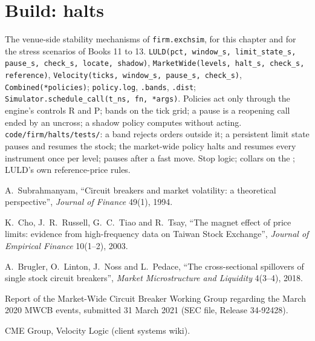 \section{Build: halts}\label{bld:mx:circuit-breakers-and-halts:halts}

\begin{build}
 The venue-side stability mechanisms of \texttt{firm.exchsim}, for this chapter and for the stress scenarios of Books 11 to 13.
 \texttt{LULD(pct, window\_s, limit\_state\_s, pause\_s, check\_s, locate, shadow)}, \texttt{MarketWide(levels, halt\_s, check\_s,
reference)}, \texttt{Velocity(ticks, window\_s, pause\_s, check\_s)}, \texttt{Combined(*policies)}; \texttt{policy.log}, \texttt{.bands},
\texttt{.dist}; \texttt{Simulator.schedule\_call(t\_ns, fn, *args)}.
 Policies act only through the engine's controls R and P; bands on the tick grid; a pause is a reopening call ended by an uncross; a
shadow policy computes without acting.
 \texttt{code/firm/halts/tests/}: a band rejects orders outside it; a persistent limit state pauses and resumes the stock; the
market-wide policy halts and resumes every instrument once per level;  pauses after a fast move.
 Stop logic; collars on the ; LULD's own reference-price rules.
\end{build}

\begin{omsources}
\item A.~Subrahmanyam, ``Circuit breakers and market volatility: a theoretical perspective'', \emph{Journal of Finance} 49(1), 1994.
\item K.~Cho, J.~R.~Russell, G.~C.~Tiao and R.~Tsay, ``The magnet effect of price limits: evidence from high-frequency data on Taiwan Stock
Exchange'', \emph{Journal of Empirical Finance} 10(1--2), 2003.
\item A.~Brugler, O.~Linton, J.~Noss and L.~Pedace, ``The cross-sectional spillovers of single stock circuit breakers'', \emph{Market Microstructure and
Liquidity} 4(3--4), 2018.
\item Report of the Market-Wide Circuit Breaker Working Group regarding the March 2020 MWCB events, submitted 31 March 2021 (SEC file, Release 34-92428).
\item CME Group, Velocity Logic (client systems wiki).
\end{omsources}

